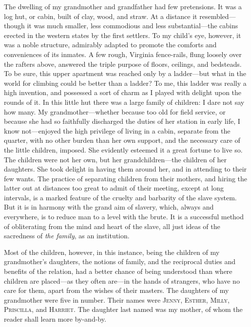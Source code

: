 The dwelling of my grandmother and grandfather had few pretensions. It
was a log hut, or cabin, {\protect\hypertarget{37}{}{}}built of clay,
wood, and straw. At a distance it resembled---though it was much
smaller, less commodious and less substantial---the cabins erected in
the western states by the first settlers. To my child's eye, however, it
was a noble structure, admirably adapted to promote the comforts and
conveniences of its inmates. A few rough, Virginia fence-rails, flung
loosely over the rafters above, answered the triple purpose of floors,
ceilings, and bedsteads. To be sure, this upper apartment was reached
only by a ladder---but what in the world for climbing could be better
than a ladder? To me, this ladder was really a high invention, and
possessed a sort of charm as I played with delight upon the rounds of
it. In this little hut there was a large family of children: I dare not
say how many. My grandmother---whether because too old for field
service, or because she had so faithfully discharged the duties of her
station in early life, I know not---enjoyed the high privilege of living
in a cabin, separate from the quarter, with no other burden than her own
support, and the necessary care of the little children, imposed. She
evidently esteemed it a great fortune to live so. The children were not
her own, but her grandchildren---the children of her daughters. She took
delight in having them around her, and in attending to their few wants.
The practice of separating children from their mothers, and hiring the
latter out at distances too great to admit of their meeting, except at
long intervals, is a marked feature of the cruelty and barbarity of the
slave system. But it is in harmony with the grand aim of slavery, which,
always and everywhere, is to {\protect\hypertarget{38}{}{}}reduce man to
a level with the brute. It is a successful method of obliterating from
the mind and heart of the slave, all just ideas of the sacredness of
\emph{the family}, as an institution.

Most of the children, however, in this instance, being the children of
my grandmother's daughters, the notions of family, and the reciprocal
duties and benefits of the relation, had a better chance of being
understood than where children are placed---as they often are---in the
hands of strangers, who have no care for them, apart from the wishes of
their masters. The daughters of my grandmother were five in number.
Their names were \textsc{Jenny, Esther, Milly, Priscilla}, and
\textsc{Harriet}. The daughter last named was my mother, of whom the
reader shall learn more by-and-by.

